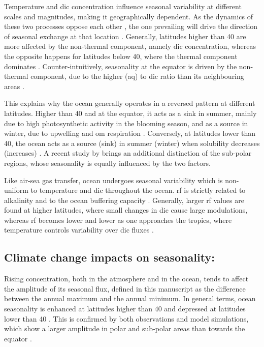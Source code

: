 Temperature and \ac{dic} concentration influence seasonal variability at different scales and magnitudes, making it geographically dependent. As the dynamics of these two processes oppose each other \citep{lerner2021drivers, takahashi2002global}, the one prevailing will drive the direction of seasonal  exchange at that location \citep{sarmiento2006ocean}. Generally, latitudes higher than 40\textdegree{} are more affected by the non-thermal component, namely \ac{dic} concentration, whereas the opposite happens for latitudes below 40\textdegree{}, where the thermal component dominates \citep{mcneil2019changing, gallego2018drivers, sarmiento2006ocean}. Counter-intuitively, seasonality at the equator is driven by the non-thermal component, due to the higher (aq) to \ac{dic} ratio than its neighbouring areas \citep{fassbender2017nonuniform}. 

This explains why the ocean generally operates in a reversed pattern at different latitudes. Higher than 40\textdegree{} and at the equator, it acts as a  sink in summer, mainly due to high photosynthetic activity in the blooming season, and as a source in winter, due to upwelling and \ac{om} respiration \citep{gallego2018drivers, takahashi2002global}. Conversely, at latitudes lower than 40\textdegree{}, the ocean acts as a  source (sink) in summer (winter) when solubility decreases (increases) \citep{yun2022enhance}. A recent study by \cite{lerner2021drivers} brings an additional distinction of the sub-polar regions, whose  seasonality is equally influenced by the two factors.

Like air-sea gas transfer, ocean  undergoes seasonal variability which is non-uniform to temperature and \ac{dic} throughout the ocean. \ac{rf} is strictly related to alkalinity and to the ocean buffering capacity \citep{egleston2010revelle}. Generally, larger \ac{rf} values are found at higher latitudes, where small changes in \ac{dic} cause large  modulations, whereas \ac{rf} becomes lower and lower as one approaches the tropics, where temperature controls  variability over \ac{dic} fluxes \citep{fassbender2018seasonal}. 

\subsection{Climate change impacts on  seasonality:}

Rising  concentration, both in the atmosphere and in the ocean, tends to affect the amplitude of its seasonal flux, defined in this manuscript as the difference between the annual maximum and the annual minimum. In general terms, ocean  seasonality is enhanced at latitudes higher than 40\textdegree{} and depressed at latitudes lower than 40\textdegree{} \citep{yun2022enhance}. This is confirmed by both observations and model simulations, which show a larger  amplitude in polar and sub-polar areas than towards the equator \citep{schwinger2022report, gallego2018drivers}. 

